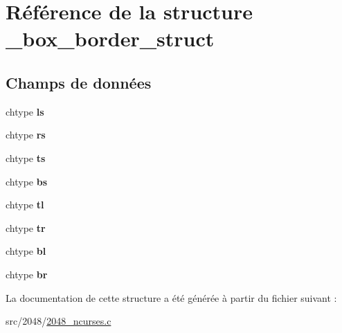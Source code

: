 \hypertarget{struct__box__border__struct}{
\section{Référence de la structure \_\-box\_\-border\_\-struct}
\label{struct__box__border__struct}
}
\subsection*{Champs de données}
\begin{DoxyCompactItemize}
\item 
\hypertarget{struct__box__border__struct_abd02d40f8d96464f6dbe6ed060b3b41f}{
chtype {\bfseries ls}}
\label{struct__box__border__struct_abd02d40f8d96464f6dbe6ed060b3b41f}

\item 
\hypertarget{struct__box__border__struct_a05a226a5255a8f41758bf472b413d4b8}{
chtype {\bfseries rs}}
\label{struct__box__border__struct_a05a226a5255a8f41758bf472b413d4b8}

\item 
\hypertarget{struct__box__border__struct_a47e109d09ccf275373c5d506c4e02a33}{
chtype {\bfseries ts}}
\label{struct__box__border__struct_a47e109d09ccf275373c5d506c4e02a33}

\item 
\hypertarget{struct__box__border__struct_a8f26ca799654e1384cfdf8e2f28b684c}{
chtype {\bfseries bs}}
\label{struct__box__border__struct_a8f26ca799654e1384cfdf8e2f28b684c}

\item 
\hypertarget{struct__box__border__struct_a3765e16187b3db788f6f97068c1a4872}{
chtype {\bfseries tl}}
\label{struct__box__border__struct_a3765e16187b3db788f6f97068c1a4872}

\item 
\hypertarget{struct__box__border__struct_a6f4b92e965aa2ec4e51d3fb7fc94dea7}{
chtype {\bfseries tr}}
\label{struct__box__border__struct_a6f4b92e965aa2ec4e51d3fb7fc94dea7}

\item 
\hypertarget{struct__box__border__struct_aeb81c1bcfad2b8e2b922790d4ab98980}{
chtype {\bfseries bl}}
\label{struct__box__border__struct_aeb81c1bcfad2b8e2b922790d4ab98980}

\item 
\hypertarget{struct__box__border__struct_afbd7a41789a8c717fea5e56a3f4e8ff7}{
chtype {\bfseries br}}
\label{struct__box__border__struct_afbd7a41789a8c717fea5e56a3f4e8ff7}

\end{DoxyCompactItemize}


La documentation de cette structure a été générée à partir du fichier suivant :\begin{DoxyCompactItemize}
\item 
src/2048/\hyperlink{2048__ncurses_8c}{2048\_\-ncurses.c}\end{DoxyCompactItemize}
